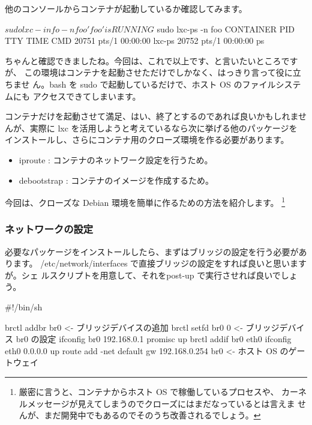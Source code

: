 \documentclass[mingoth,a4paper]{jsarticle}
\begin{document}
他のコンソールからコンテナが起動しているか確認してみます。

\begin{commandline}
$ sudo lxc-info -n foo
'foo' is RUNNING
$ sudo lxc-ps -n foo
CONTAINER    PID TTY          TIME CMD
           20751 pts/1    00:00:00 lxc-ps
           20752 pts/1    00:00:00 ps
\end{commandline}

ちゃんと確認できましたね。今回は、これで以上です、と言いたいところですが、
この環境はコンテナを起動させただけでしかなく、はっきり言って役に立ちませ
ん。bash を sudo で起動しているだけで、ホスト OS のファイルシステムにも
アクセスできてしまいます。

コンテナだけを起動させて満足、はい、終了とするのであれば良いかもしれませ
んが、実際に lxc を活用しようと考えているなら次に挙げる他のパッケージを
インストールし、さらにコンテナ用のクローズ環境を作る必要があります。

\begin{itemize}
 \item iproute : コンテナのネットワーク設定を行うため。
 \item debootstrap : コンテナのイメージを作成するため。
\end{itemize}

今回は、クローズな Debian 環境を簡単に作るための方法を紹介します。
\footnote{厳密に言うと、コンテナからホスト OS で稼働しているプロセスや、
カーネルメッセージが見えてしまうのでクローズにはまだなっているとは言えま
せんが、まだ開発中でもあるのでそのうち改善されるでしょう。}

\subsubsection{ネットワークの設定}

必要なパッケージをインストールしたら、まずはブリッジの設定を行う必要があります。
/etc/network/interfaces で直接ブリッジの設定をすれば良いと思いますが。シェ
ルスクリプトを用意して、それをpost-up で実行させれば良いでしょう。

\begin{commandline}
#!/bin/sh

brctl addbr br0                             <- ブリッジデバイスの追加
brctl setfd br0 0                           <- ブリッジデバイス br0 の設定
ifconfig br0 192.168.0.1 promisc up
brctl addif br0 eth0
ifconfig eth0 0.0.0.0 up
route add -net default gw 192.168.0.254 br0 <- ホスト OS のゲートウェイ
\end{commandline}
\end{document}
